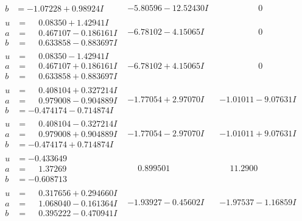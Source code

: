 \documentclass[1p]{elsarticle_modified}
\theoremstyle{definition}
\begin{document}
$$\begin{array}{c|c|c}
\begin{aligned}
b &= -1.07228 + 0.98924 I\end{aligned}
 & -5.80596 - 12.52430 I & \phantom{-0.000000 } 0 \\ \hline\begin{aligned}
u &= \phantom{-}0.08350 + 1.42941 I \\
a &= \phantom{-}0.467107 - 0.186161 I \\
b &= \phantom{-}0.633858 - 0.883697 I\end{aligned}
 & -6.78102 - 4.15065 I & \phantom{-0.000000 } 0 \\ \hline\begin{aligned}
u &= \phantom{-}0.08350 - 1.42941 I \\
a &= \phantom{-}0.467107 + 0.186161 I \\
b &= \phantom{-}0.633858 + 0.883697 I\end{aligned}
 & -6.78102 + 4.15065 I & \phantom{-0.000000 } 0 \\ \hline\begin{aligned}
u &= \phantom{-}0.408104 + 0.327214 I \\
a &= \phantom{-}0.979008 - 0.904889 I \\
b &= -0.474174 - 0.714874 I\end{aligned}
 & -1.77054 + 2.97070 I & -1.01011 - 9.07631 I \\ \hline\begin{aligned}
u &= \phantom{-}0.408104 - 0.327214 I \\
a &= \phantom{-}0.979008 + 0.904889 I \\
b &= -0.474174 + 0.714874 I\end{aligned}
 & -1.77054 - 2.97070 I & -1.01011 + 9.07631 I \\ \hline\begin{aligned}
u &= -0.433649\phantom{ +0.000000I} \\
a &= \phantom{-}1.37269\phantom{ +0.000000I} \\
b &= -0.608713\phantom{ +0.000000I}\end{aligned}
 & \phantom{-}0.899501\phantom{ +0.000000I} & \phantom{-}11.2900\phantom{ +0.000000I} \\ \hline\begin{aligned}
u &= \phantom{-}0.317656 + 0.294660 I \\
a &= \phantom{-}1.068040 - 0.161364 I \\
b &= \phantom{-}0.395222 - 0.470941 I\end{aligned}
 & -1.93927 - 0.45602 I & -1.97537 - 1.16859 I\\

\end{array}$$
\end{document}
